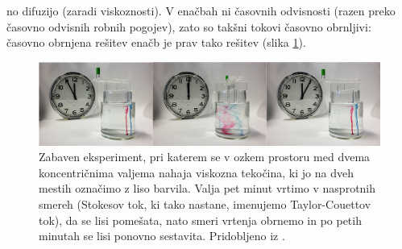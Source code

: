 \setlength{\textheight}{26.4cm}
\pagebreak
\setlength{\topmargin}{1.6cm}			%
\setlength{\headheight}{0.0cm}
\setlength{\headsep}{0.0cm}			%
\fancyhf{}
\fancyfoot[C]{\thepage}

no difuzijo (zaradi viskoznosti). V enačbah ni časovnih odvisnosti (razen preko časovno odvisnih robnih pogojev), zato so takšni tokovi časovno obrnljivi: časovno obrnjena rešitev enačb je prav tako rešitev (slika \ref{fig:TaylorCouette}).

\begin{figure}[!ht]
	\includegraphics[width = 1\textwidth]{Slike/TaylorCouette}
	\caption{Zabaven eksperiment, pri katerem se v ozkem prostoru med dvema koncentričnima valjema nahaja viskozna tekočina, ki jo na dveh mestih označimo z liso barvila. Valja pet minut vrtimo v nasprotnih smereh (Stokesov tok, ki tako nastane, imenujemo Taylor-Couettov tok), da se lisi pomešata, nato smeri vrtenja obrnemo in po petih minutah se lisi ponovno sestavita. Pridobljeno iz  \cite{Wiki-StokesFlow}.}
	\label{fig:TaylorCouette}
\end{figure}

